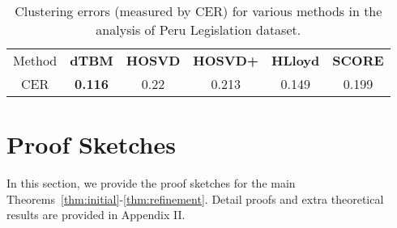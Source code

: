 \documentclass[lettersize,onecolumn,journal]{IEEEtran}
\theoremstyle{definition}
\theoremstyle{definition}
\begin{document}
\begin{table}[ht]
    \centering
    \begin{tabular}{c |c  c cc c}
    \hline
        Method & \textbf{\small dTBM} 
        &\textbf{\small HOSVD}
        &\textbf{\small HOSVD+} & \textbf{\small HLloyd} &  \textbf{\small SCORE}\\
         CER & \textbf{0.116}
         &  0.22 
         &0.213 & 0.149 &0.199\\
         \hline
    \end{tabular}
    \caption{Clustering errors (measured by CER) for various methods in the analysis of Peru Legislation dataset.}
    \label{tab:peru}
\end{table}



\section{Proof Sketches}\label{sec:mainproof}

In this section, we provide the proof sketches for the main Theorems~\ref{thm:initial}-\ref{thm:refinement}. Detail proofs and extra theoretical results are provided in Appendix II.
\end{document}
